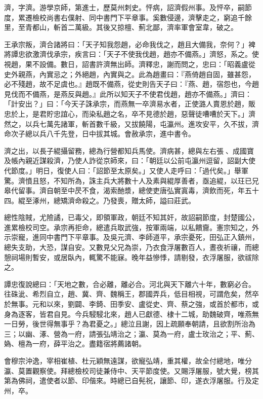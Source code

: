 \begin{pinyinscope}
 濟，字濟。游學京師，第進士，歷莫州刺史。怦病，詔濟假州事。及怦卒，嗣節度，累遷檢校尚書右僕射、同中書門下平章事。奚數侵邊，濟擊走之，窮追千餘里，至青都山，斬首二萬級。其後又掠檀、薊北鄙，濟率軍會室韋，破之。



 王承宗叛，濟合諸將曰：「天子知我怨趙，必命我伐之，趙且大備我，奈何？」裨將譚忠欲激濟伐承宗，疾言曰：「天子不使我伐趙，趙亦不備燕。」濟怒，系之。使視趙，果不設備。數日，詔書許濟無出師。濟釋忠，謝而問之，忠曰：「昭義盧從史外親燕，內實忌之；外絕趙，內實與之。此為趙畫曰：『燕倚趙自固，雖甚怨，必不殘趙，故不足虞也。』趙既不備燕，從史則告天子曰：『燕、趙，宿怨也，今趙見伐而不備燕，是燕反與趙。』此所以知天子不使君伐趙，趙亦不備燕。」濟曰：「計安出？」曰：「今天子誅承宗，而燕無一卒濟易水者，正使潞人賣恩於趙，販忠於上，是君貯忠誼心，而染私趙之名，卒不見德於趙，惡聲徒嘈嘈於天下。」濟然之，以兵七萬先諸軍，斬首數千級，又拔饒陽，屯瀛州。進攻安平，久不拔，濟命次子總以兵八千先登，日中拔其城。會赦承宗，進中書令。



 濟之出，以長子緄攝留務，總為行營都知兵馬使。濟病甚，總與左右張、成國寶及帳內親近謀殺濟，乃使人詐從京師來，曰：「朝廷以公前屯瀛州逗留，詔副大使代節度。」明日，復使人曰：「詔節至太原矣。」又使人走呼曰：「過代矣。」舉軍驚。濟憤且怒，不知所為，誅主兵大將數十人及素與緄厚善者，亟追緄，以玨已兄皋代留事。濟自朝至中昃不食，渴索酏漿，總使吏唐弘實寘毒，濟飲而死，年五十四。緄至涿州，總矯濟命殺之。乃發喪，贈太師，謚曰莊武。



 總性陰賊，尤險譎，已毒父，即領軍政，朝廷不知其奸，故詔嗣節度，封楚國公，進累檢校司空。承宗再拒命，總遣兵取武強，按軍兩端，以私饋齎。憲宗知之，外示崇寵，進同中書門下平章事。及吳元濟、李師道平，承宗憂死，田弘正入鎮州，總失支助，大恐，謀自安。又數見父兄為崇，乃衣食浮屠數百人，晝夜祈禳，而總憩祠場則暫安，或居臥內，輒驚不能寐。晚年益慘悸，請剔發，衣浮屠服，欲祓除之。



 譚忠復說總曰：「天地之數，合必離，離必合。河北與天下離六十年，數窮必合。往硃泚、希烈自立，趙、冀、齊、魏稱王，郡國弄兵，低目相視，可謂危矣，然卒於無事。元和以來，劉闢、李錡、田季安、盧從史、齊、蔡之強，或首於都市，或身為逐客，皆君自見。今兵駸駸北來，趙人已獻德、棣十二城，助魏破齊，唯燕無一日勞，後世得無事乎？為君憂之。」總泣且謝，因上疏願奉朝請，且欲割所治為三；以幽、涿、營為一府，請張弘靖治之；瀛、莫為一府，盧士玫治之；平、薊、媯、檀為一府，薛平治之。盡籍宿將薦諸朝。



 會穆宗沖逸，宰相崔植、杜元穎無遠謀，欲寵弘靖，重其權，故全付總地，唯分瀛、莫置觀察使。拜總檢校司徒兼侍中、天平節度使。又賜浮屠服，號大覺，榜其第為佛祠，遣使者以節、印偕來。時總已自髡祝，讓節、印，遂衣浮屠服。行及定州，卒。




\end{pinyinscope}
